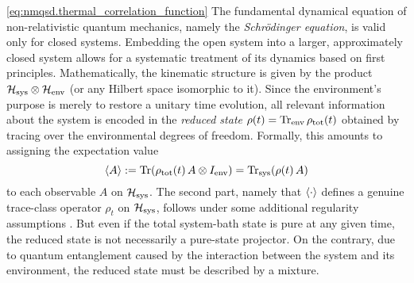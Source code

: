 \ref{eq:nmqsd.thermal_correlation_function}
The fundamental dynamical equation of non-relativistic quantum mechanics, namely the \emph{Schrödinger equation}, is valid only for closed systems.
Embedding the open system into a larger, approximately closed system allows for a systematic treatment of its dynamics based on first principles.
Mathematically, the kinematic structure is given by the product $\mathcal{H}_\mathrm{sys}\otimes\mathcal{H}_\mathrm{env}$ (or any Hilbert space isomorphic to it).
Since the environment's purpose is merely to restore a unitary time evolution, all relevant information about the system is encoded in the \emph{reduced state} $\rho(t) = \operatorname{Tr}_\mathrm{env} \rho_\mathrm{tot}(t)$ obtained by tracing over the environmental degrees of freedom.
Formally, this amounts to assigning the expectation value
\begin{equation}
  \langle A \rangle := \operatorname{Tr}(\rho_\mathrm{tot}(t) \, A\otimes I_\mathrm{env}) = \operatorname{Tr}_\mathrm{sys}(\rho(t) \, A)
  \label{eq:intro.reduced_state}
\end{equation}
to each observable $A$ on $\mathcal{H}_\mathrm{sys}$.
The second part, namely that $\langle \cdot \rangle$ defines a genuine trace-class operator $\rho_t$ on $\mathcal{H}_\mathrm{sys}$, follows under some additional regularity assumptions \cite{BrRo03_operator_algebras}.
But even if the total system-bath state is pure at any given time, the reduced state is not necessarily a pure-state projector.
On the contrary, due to quantum entanglement caused by the interaction between the system and its environment, the reduced state must be described by a mixture.\\




